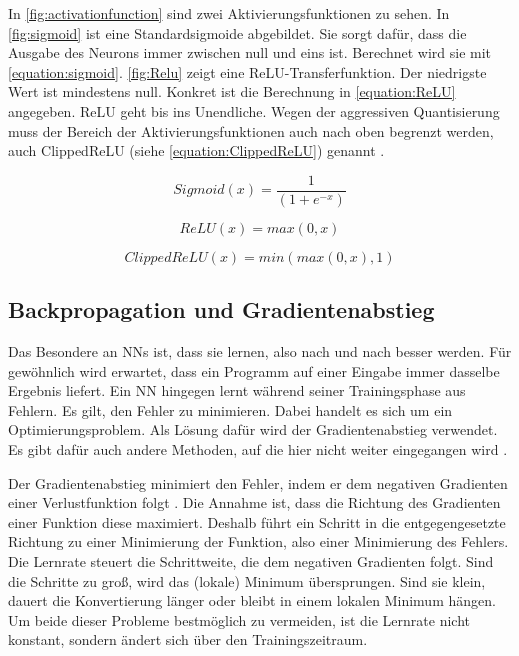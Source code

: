 In \autoref{fig:activationfunction} sind zwei Aktivierungsfunktionen zu sehen. In \autoref{fig:sigmoid} ist eine Standardsigmoide abgebildet. Sie sorgt dafür, dass die Ausgabe des Neurons immer zwischen null und eins ist. Berechnet wird sie mit \autoref{equation:sigmoid}. \autoref{fig:Relu} zeigt eine \ac{ReLU}-Transferfunktion. Der niedrigste Wert ist mindestens null. Konkret ist die Berechnung in \autoref{equation:ReLU} angegeben. \ac{ReLU} geht bis ins Unendliche. Wegen der aggressiven Quantisierung muss der Bereich der Aktivierungsfunktionen auch nach oben begrenzt werden, auch Clipped\ac{ReLU} (siehe \autoref{equation:ClippedReLU}) genannt \cite{StockfishNNUE}.

\begin{equation}
  Sigmoid(x)=\frac{1}{(1+e^{-x})}
  \label{equation:sigmoid}
\end{equation}

\begin{equation}
  ReLU(x)=max(0,x)
  \label{equation:ReLU}
\end{equation}

\begin{equation}
  ClippedReLU(x)=min(max(0,x),1)
  \label{equation:ClippedReLU}
\end{equation}


\subsection{Backpropagation und Gradientenabstieg}
\label{chap:bpGradient}
Das Besondere an \acp{NN} ist, dass sie lernen, also nach und nach besser werden. Für gewöhnlich wird erwartet, dass ein Programm auf einer Eingabe immer dasselbe Ergebnis liefert. Ein \ac{NN} hingegen lernt während seiner Trainingsphase aus Fehlern. Es gilt, den Fehler zu minimieren. Dabei handelt es sich um ein Optimierungsproblem. Als Lösung dafür wird der Gradientenabstieg verwendet. Es gibt dafür auch andere Methoden, auf die hier nicht weiter eingegangen wird \cite{StockfishNNUE}.

Der Gradientenabstieg minimiert den Fehler, indem er dem negativen Gradienten einer Verlustfunktion folgt \cite{Ruder2016}. Die Annahme ist, dass die Richtung des Gradienten einer Funktion diese maximiert. Deshalb führt ein Schritt in die entgegengesetzte Richtung zu einer Minimierung der Funktion, also einer Minimierung des Fehlers. Die Lernrate steuert die Schrittweite, die dem negativen Gradienten folgt. Sind die Schritte zu groß, wird das (lokale) Minimum übersprungen. Sind sie klein, dauert die Konvertierung länger oder bleibt in einem lokalen Minimum hängen. Um beide dieser Probleme bestmöglich zu vermeiden, ist die Lernrate nicht konstant, sondern ändert sich über den Trainingszeitraum.

